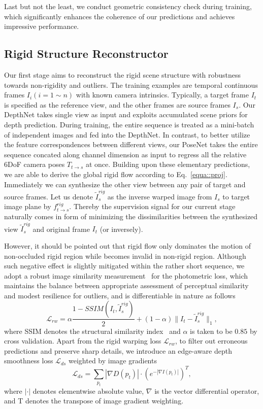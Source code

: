 Last but not the least, we conduct geometric consistency check during training, which significantly enhances the coherence of our predictions and achieves impressive performance.



\subsection{Rigid Structure Reconstructor}
\label{sec::static}

Our first stage aims to reconstruct the rigid scene structure with robustness towards non-rigidity and outliers. The training examples are temporal continuous frames $I_{i} (i=1\sim n)$ with known camera intrinsics. Typically, a target frame $I_t$ is specified as the reference view, and the other frames are source frames $I_s$. Our DepthNet takes single view as input and exploits accumulated scene priors for depth prediction. During training, 
the entire sequence is treated as a mini-batch of independent images and fed into the DepthNet.
In contrast, to better utilize the feature correspondences between different views, our PoseNet takes the entire sequence concated along channel dimension as input to regress all the relative 6DoF camera poses $T_{t\to s}$ at once. Building upon these elementary predictions, we are able to derive the global rigid flow according to Eq.~\eqref{equa::proj}. Immediately we can synthesize the other view between any pair of target and source frames. Let us denote $\tilde{I}_s^{rig}$ as the inverse warped image from $I_s$ to target image plane by $f_{t\to s}^{rig}$. 
Thereby the supervision signal for our current stage naturally comes in form of minimizing the dissimilarities between the synthesized view $\tilde{I}_s^{rig}$ and original frame $I_t$ (or inversely).

However, it should be pointed out that rigid flow only dominates the motion of non-occluded rigid region while becomes invalid in non-rigid region. Although such negative effect is slightly mitigated within the rather short sequence, we adopt a robust image similarity measurement~\cite{monodepth17} for the photometric loss, which maintains the balance between appropriate assessment of perceptual similarity and modest resilience for outliers, and is differentiable in nature as follows
\begin{equation}
    \label{equa::ssim}
\mathcal{L}_{rw}=\alpha\frac{1-SSIM(I_t,\tilde{I}_s^{rig})}{2}+(1-\alpha)\|I_t-\tilde{I}_s^{rig}\|_1,
\end{equation}
where SSIM denotes the structural similarity index~\cite{wang2004image} and $\alpha$ is taken to be $0.85$ by cross validation. Apart from the rigid warping loss $\mathcal{L}_{rw}$, to filter out erroneous predictions and preserve sharp details, we introduce an edge-aware depth smoothness loss $\mathcal{L}_{ds}$ weighted by image gradients
\begin{equation}
    \label{equa::smooth}
\mathcal{L}_{ds}=\sum_{p_t}|\nabla D(p_t)|\cdot (e^{-|\nabla I(p_t)|})^T,
\end{equation}
where $|\cdot|$ denotes elementwise absolute value, $\nabla$ is the vector differential operator, and T denotes the transpose of image gradient weighting.


